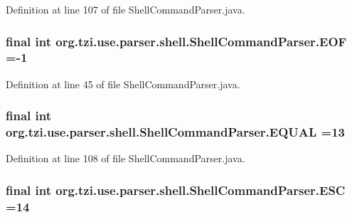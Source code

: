 Definition at line 107 of file Shell\-Command\-Parser.\-java.

\hypertarget{classorg_1_1tzi_1_1use_1_1parser_1_1shell_1_1_shell_command_parser_aa0b629f163714808a4ee8750266c1aa5}{
\subsubsection[{E\-O\-F}]{\setlength{\rightskip}{0pt plus 5cm}final int org.\-tzi.\-use.\-parser.\-shell.\-Shell\-Command\-Parser.\-E\-O\-F =-\/1\hspace{0.3cm}{\ttfamily [static]}}}\label{classorg_1_1tzi_1_1use_1_1parser_1_1shell_1_1_shell_command_parser_aa0b629f163714808a4ee8750266c1aa5}


Definition at line 45 of file Shell\-Command\-Parser.\-java.

\hypertarget{classorg_1_1tzi_1_1use_1_1parser_1_1shell_1_1_shell_command_parser_abf65cc94a69b818a75a6577d5ae3d4a3}{
\subsubsection[{E\-Q\-U\-A\-L}]{\setlength{\rightskip}{0pt plus 5cm}final int org.\-tzi.\-use.\-parser.\-shell.\-Shell\-Command\-Parser.\-E\-Q\-U\-A\-L =13\hspace{0.3cm}{\ttfamily [static]}}}\label{classorg_1_1tzi_1_1use_1_1parser_1_1shell_1_1_shell_command_parser_abf65cc94a69b818a75a6577d5ae3d4a3}


Definition at line 108 of file Shell\-Command\-Parser.\-java.

\hypertarget{classorg_1_1tzi_1_1use_1_1parser_1_1shell_1_1_shell_command_parser_a796127b82279951f4ed7637f227fe140}{
\subsubsection[{E\-S\-C}]{\setlength{\rightskip}{0pt plus 5cm}final int org.\-tzi.\-use.\-parser.\-shell.\-Shell\-Command\-Parser.\-E\-S\-C =14\hspace{0.3cm}{\ttfamily [static]}}}\label{classorg_1_1tzi_1_1use_1_1parser_1_1shell_1_1_shell_command_parser_a796127b82279951f4ed7637f227fe140}


